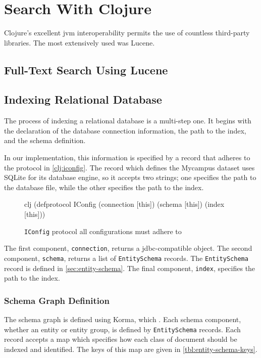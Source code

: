 \section{Search With Clojure}
	Clojure's excellent \gls{jvm} interoperability permits the use of countless third-party libraries.  The most extensively used was Lucene.
	
	\subsection{Full-Text Search Using Lucene}
	
	\subsection{Indexing Relational Database}
		The process of indexing a relational database is a multi-step one.  It begins with the declaration of the database connection information, the path to the index, and the schema definition.
		
		In our implementation, this information is specified by a record that adheres to the protocol in \vref{clj:iconfig}.  The record which defines the Mycampus dataset uses SQLite for its database engine, so it accepts two strings; one specifies the path to the database file, while the other specifies the path to the index.
		
		\begin{figure}
			\begin{singlespaced}
				\begin{pygments}[firstnumber=16]{clj}
(defprotocol IConfig
  (connection [this])
  (schema [this])
  (index [this]))
				\end{pygments}
			\end{singlespaced}
			
			\caption{\texttt{IConfig} protocol all configurations must adhere to}
			\label{clj:iconfig}
		\end{figure}
		
		The first component, \texttt{connection}, returns a \gls{jdbc}-compatible object.  The second component, \texttt{schema}, returns a list of \texttt{EntitySchema} records.  The \texttt{EntitySchema} record is defined in \vref{sec:entity-schema}.  The final component, \texttt{index}, specifies the path to the index.
		
		\subsubsection{Schema Graph Definition}
		\label{sec:entity-schema}
			The schema graph is defined using Korma, which .  Each schema component, whether an entity or entity group, is defined by \texttt{EntitySchema} records.  Each record accepts a map which specifies how each class of document should be indexed and identified.  The keys of this map are given in \vref{tbl:entity-schema-keys}.
			
